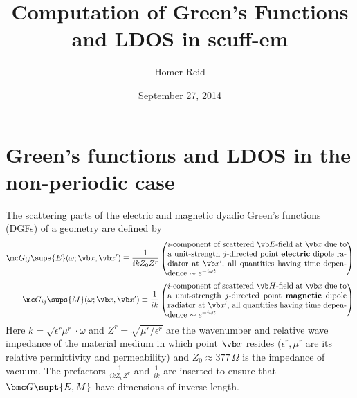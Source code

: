 \documentclass[letterpaper]{article}
\title {Computation of Green's Functions and LDOS in {\sc scuff-em}}
\author {Homer Reid}
\date {September 27, 2014}
\begin{document}
\pagestyle{myheadings}
\maketitle

\tableofcontents

\newpage
\section{Green's functions and LDOS in the non-periodic case}

The scattering parts of the electric and magnetic
dyadic Green's functions (DGFs) of a geometry are defined by
\begin{align*}
 \mc G_{ij}\sups{E}(\omega; \vb x, \vb x^\prime)
   \equiv
   \frac{1}{ikZ_0 Z^r}
  &\left( \parbox{0.65\textwidth}
    { $i$-component of scattered $\vb E$-field at $\vb x$
      due to a unit-strength $j$-directed point \textbf{electric} 
      dipole radiator
      at $\vb x^\prime$, all quantities having time dependence
      $\sim e^{-i\omega t}$
    }
   \right)
\\[5pt]
 \mc G_{ij}\sups{M}(\omega; \vb x, \vb x^\prime)
   \equiv
   \frac{1}{ik}
  &\left( \parbox{0.65\textwidth}
    { $i$-component of scattered $\vb H$-field at $\vb x$
      due to a unit-strength $j$-directed point \textbf{magnetic}
      dipole radiator
      at $\vb x^\prime$, all quantities having time dependence
      $\sim e^{-i\omega t}$
    }
   \right)
\end{align*}
Here $k=\sqrt{\epsilon^r \mu^r }\cdot \omega$ and 
$Z^r=\sqrt{\mu^r /\epsilon^r }$ are the wavenumber and 
relative wave impedance of the material medium in which 
point $\vb x$ resides ($\epsilon^r ,\mu^r$ are its relative 
permittivity and permeability) and $Z_0\approx 377\,\Omega$  
is the impedance of vacuum. The prefactors 
$\frac{1}{ikZ_0Z^r}$ and $\frac{1}{ik}$ are inserted to 
ensure that $\bmc G\supt{E,M}$ have dimensions of inverse
length.
\end{document}
